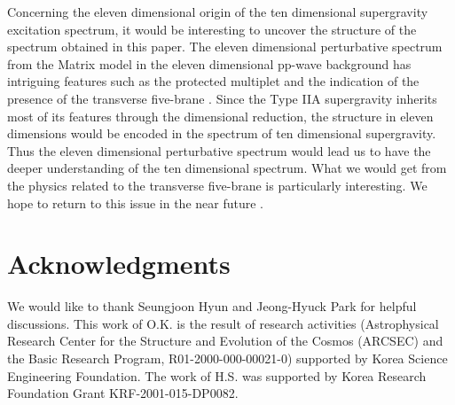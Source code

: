 \documentclass[a4paper,12pt]{article}
\numberwithin{equation}{section}
\begin{document}
Concerning the eleven dimensional origin of the ten dimensional
supergravity excitation spectrum, it would be interesting to uncover
the structure of the spectrum obtained in this paper.  The eleven
dimensional perturbative spectrum from the Matrix model in the eleven
dimensional pp-wave background has intriguing features such as the
protected multiplet and the indication of the presence of the
transverse five-brane \cite{das050,mal139}.  Since the Type IIA
supergravity inherits most of its features through the dimensional
reduction, the structure in eleven dimensions would be encoded in the
spectrum of ten dimensional supergravity.  Thus the eleven dimensional
perturbative spectrum would lead us to have the deeper understanding
of the ten dimensional spectrum.  What we would get from the physics
related to the transverse five-brane is particularly interesting.  We
hope to return to this issue in the near future \cite{kwo}.




\section*{Acknowledgments}
We would like to thank Seungjoon Hyun and Jeong-Hyuck Park for helpful
discussions.  This work of O.K. is the result of research activities
(Astrophysical Research Center for the Structure and Evolution of the
Cosmos (ARCSEC) and the Basic Research Program, R01-2000-000-00021-0)
supported by Korea Science \myHighlight{$\&$}\coordHE{} Engineering Foundation.  The work of
H.S. was supported by Korea Research Foundation Grant
KRF-2001-015-DP0082.
\end{document}
